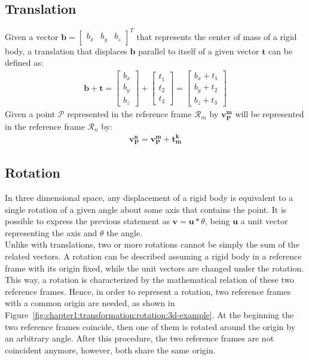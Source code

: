 \subsection{Translation}
\label{subsec:chapter1:transform:translation}
Given a vector $\bm{b} = \begin{bmatrix}b_x & b_y & b_z\end{bmatrix}^T$ that represents the center of mass of a rigid body, a translation that displaces $\bm{b}$ parallel to itself of a given vector $\bm{t}$ can be defined as:
\begin{align*}
    \bm{b} + \bm{t} = \begin{bmatrix}
        b_x \\ b_y \\ b_z
    \end{bmatrix} + \begin{bmatrix}
    t_1 \\ t_2 \\ t_3
\end{bmatrix} = \begin{bmatrix}
        b_x + t_1\\ b_y + t_2 \\ b_z + t_3
\end{bmatrix}
\end{align*}
Given a point $\mathcal{P}$ represented in the reference frame $\mathcal{R}_m$ by $\bm{v_P^m}$ will be represented in the reference frame $\mathcal{R}_n$ by:
\begin{align*}
    \bm{v_P^n} = \bm{v_P^m} + \bm{t_m^k}
\end{align*}

\subsection{Rotation}
\label{subsec:chapter1:transform:rotation}
In three dimensional space, any displacement of a rigid body is equivalent to a single rotation of a given angle about some axis that contains the point. It is possible to express the previous statement as $\bm{v} = \bm{u} * \theta$, being $\bm{u}$ a unit vector representing the axis and $\theta$ the angle.\\

Unlike with translations, two or more rotations cannot be simply the sum of the related vectors. A rotation can be described assuming a rigid body in a reference frame with its origin fixed, while the unit vectors are changed under the rotation. This way, a rotation is characterized by the mathematical relation of these two reference frames. Hence, in order to represent a rotation, two reference frames with a common origin are needed, as shown in Figure~\ref{fig:chapter1:transformation:rotation:3d-example}. At the beginning the two reference frames coincide, then one of them is rotated around the origin by an arbitrary angle. After this procedure, the two reference frames are not coincident anymore, however, both share the same origin.\\

